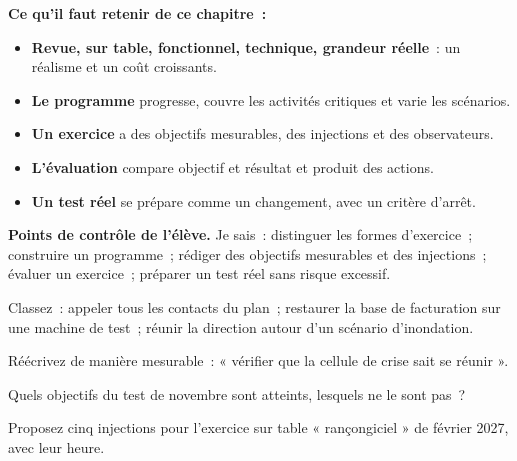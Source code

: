 \begin{boxresume}
\textbf{Ce qu'il faut retenir de ce chapitre~:}
\begin{itemize}
    \item \textbf{Revue, sur table, fonctionnel, technique, grandeur
          réelle}~: un réalisme et un coût croissants.
    \item \textbf{Le programme} progresse, couvre les activités critiques et
          varie les scénarios.
    \item \textbf{Un exercice} a des objectifs mesurables, des injections et
          des observateurs.
    \item \textbf{L'évaluation} compare objectif et résultat et produit des
          actions.
    \item \textbf{Un test réel} se prépare comme un changement, avec un
          critère d'arrêt.
\end{itemize}
\end{boxresume}

\begin{boxinfo}
\textbf{Points de contrôle de l'élève.} Je sais~: distinguer les formes
d'exercice~; construire un programme~; rédiger des objectifs mesurables et
des injections~; évaluer un exercice~; préparer un test réel sans risque
excessif.
\end{boxinfo}

\bigskip

\begin{boxexo}[title={\ding{45}\quad Exercice~20.1. Quelle forme~? \niveaubase}]
Classez~: appeler tous les contacts du plan~; restaurer la base de
facturation sur une machine de test~; réunir la direction autour d'un
scénario d'inondation.
\end{boxexo}

\begin{boxexo}[title={\ding{45}\quad Exercice~20.2. Mesurable \niveaubase}]
Réécrivez de manière mesurable~: « vérifier que la cellule de crise sait
se réunir ».
\end{boxexo}

\begin{boxexo}[title={\ding{45}\quad Exercice~20.3. Le test de novembre \niveaubase}]
Quels objectifs du test de novembre sont atteints, lesquels ne le sont
pas~?
\end{boxexo}

\begin{boxexo}[title={\ding{45}\quad Exercice~20.4. Injections \niveaumoyen}]
Proposez cinq injections pour l'exercice sur table « rançongiciel » de
février 2027, avec leur heure.
\end{boxexo}

